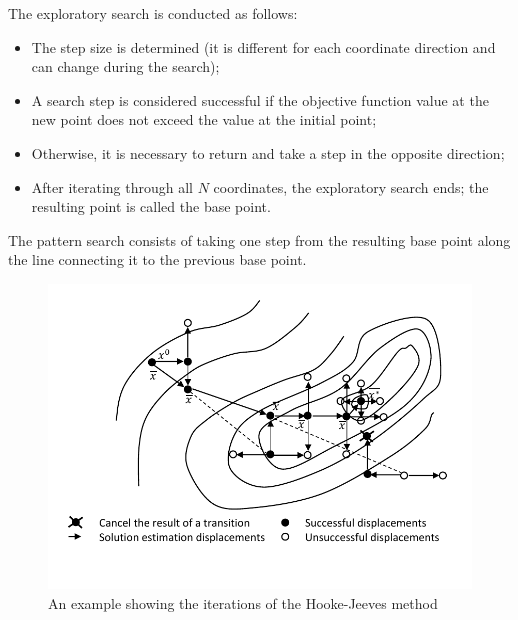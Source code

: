 \documentclass[runningheads]{llncs}
\begin{document}

The exploratory search is conducted as follows:
\begin{itemize}[label=$\bullet$] 
	\item The step size is determined (it is different for each coordinate direction and can change during the search);
	\item A search step is considered successful if the objective function value at the new point does not exceed the value at the initial point; 
	\item Otherwise, it is necessary to return and take a step in the opposite direction; 
	\item After iterating through all $N$ coordinates, the exploratory search ends; the resulting point is called the base point.
\end{itemize}
The pattern search consists of taking one step from the resulting base point along the line connecting it to the previous base point.



\begin{figure} 
	\begin{center} 
		\begin{minipage}[h]{1.0\linewidth} 
			\includegraphics[width=1\linewidth]{figure/fig1.pdf} 
			\caption{An example showing the iterations of the Hooke-Jeeves method} %
			\label{fig:fig1} 
		\end{minipage} 
	\end{center} 
\end{figure}	
\end{document}
